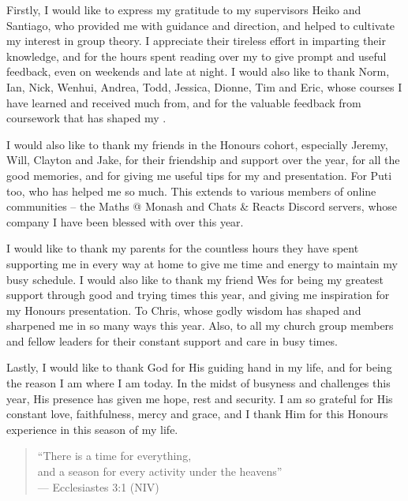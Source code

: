 Firstly, I would like to express my gratitude to my supervisors Heiko and Santiago, who provided me with guidance and direction, and helped to cultivate my interest in group theory. I appreciate their tireless effort in imparting their knowledge, and for the hours spent reading over my \thesis{} to give prompt and useful feedback, even on weekends and late at night. I would also like to thank Norm, Ian, Nick, Wenhui, Andrea, Todd, Jessica, Dionne, Tim and Eric, whose courses I have learned and received much from, and for the valuable feedback from coursework that has shaped my \thesis{}.

I would also like to thank my friends in the Honours cohort, especially Jeremy, Will, Clayton and Jake, for their friendship and support over the year, for all the good memories, and for giving me useful tips for my \thesis{} and presentation. For Puti too, who has helped me so much. This extends to various members of online communities -- the Maths @ Monash and Chats \& Reacts Discord servers, whose company I have been blessed with over this year.

I would like to thank my parents for the countless hours they have spent supporting me in every way at home to give me time and energy to maintain my busy schedule. I would also like to thank my friend Wes for being my greatest support through good and trying times this year, and giving me inspiration for my Honours presentation. To Chris, whose godly wisdom has shaped and sharpened me in so many ways this year. Also, to all my church group members and fellow leaders for their constant support and care in busy times.

Lastly, I would like to thank God for His guiding hand in my life, and for being the reason I am where I am today. In the midst of busyness and challenges this year, His presence has given me hope, rest and security. I am so grateful for His constant love, faithfulness, mercy and grace, and I thank Him for this Honours experience in this season of my life.

\begin{quote}
    ``There is a time for everything, \\
    \hspace*{15pt} and a season for every activity under the heavens'' \\
    \null\hfill --- Ecclesiastes 3:1 (NIV)
\end{quote}